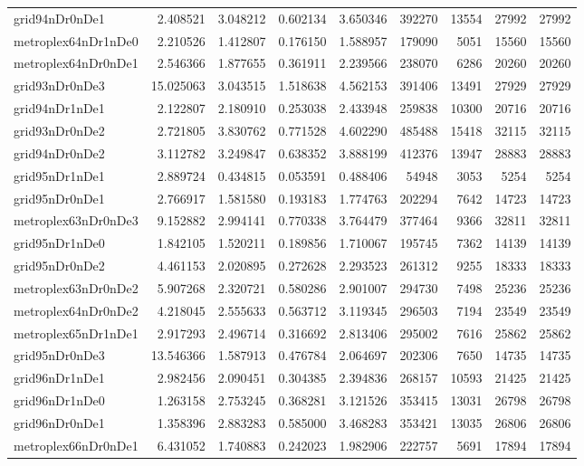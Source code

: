 \begin{longtable}{|l|r|r|r|r|r|r|r|r|}
grid94nDr0nDe1 & 2.408521 & 3.048212 & 0.602134 & 3.650346 & 392270 & 13554 & 27992 & 27992 \\
metroplex64nDr1nDe0 & 2.210526 & 1.412807 & 0.176150 & 1.588957 & 179090 & 5051 & 15560 & 15560 \\
metroplex64nDr0nDe1 & 2.546366 & 1.877655 & 0.361911 & 2.239566 & 238070 & 6286 & 20260 & 20260 \\
grid93nDr0nDe3 & 15.025063 & 3.043515 & 1.518638 & 4.562153 & 391406 & 13491 & 27929 & 27929 \\
grid94nDr1nDe1 & 2.122807 & 2.180910 & 0.253038 & 2.433948 & 259838 & 10300 & 20716 & 20716 \\
grid93nDr0nDe2 & 2.721805 & 3.830762 & 0.771528 & 4.602290 & 485488 & 15418 & 32115 & 32115 \\
grid94nDr0nDe2 & 3.112782 & 3.249847 & 0.638352 & 3.888199 & 412376 & 13947 & 28883 & 28883 \\
grid95nDr1nDe1 & 2.889724 & 0.434815 & 0.053591 & 0.488406 & 54948 & 3053 & 5254 & 5254 \\
grid95nDr0nDe1 & 2.766917 & 1.581580 & 0.193183 & 1.774763 & 202294 & 7642 & 14723 & 14723 \\
metroplex63nDr0nDe3 & 9.152882 & 2.994141 & 0.770338 & 3.764479 & 377464 & 9366 & 32811 & 32811 \\
grid95nDr1nDe0 & 1.842105 & 1.520211 & 0.189856 & 1.710067 & 195745 & 7362 & 14139 & 14139 \\
grid95nDr0nDe2 & 4.461153 & 2.020895 & 0.272628 & 2.293523 & 261312 & 9255 & 18333 & 18333 \\
metroplex63nDr0nDe2 & 5.907268 & 2.320721 & 0.580286 & 2.901007 & 294730 & 7498 & 25236 & 25236 \\
metroplex64nDr0nDe2 & 4.218045 & 2.555633 & 0.563712 & 3.119345 & 296503 & 7194 & 23549 & 23549 \\
metroplex65nDr1nDe1 & 2.917293 & 2.496714 & 0.316692 & 2.813406 & 295002 & 7616 & 25862 & 25862 \\
grid95nDr0nDe3 & 13.546366 & 1.587913 & 0.476784 & 2.064697 & 202306 & 7650 & 14735 & 14735 \\
grid96nDr1nDe1 & 2.982456 & 2.090451 & 0.304385 & 2.394836 & 268157 & 10593 & 21425 & 21425 \\
grid96nDr1nDe0 & 1.263158 & 2.753245 & 0.368281 & 3.121526 & 353415 & 13031 & 26798 & 26798 \\
grid96nDr0nDe1 & 1.358396 & 2.883283 & 0.585000 & 3.468283 & 353421 & 13035 & 26806 & 26806 \\
metroplex66nDr0nDe1 & 6.431052 & 1.740883 & 0.242023 & 1.982906 & 222757 & 5691 & 17894 & 17894 \\

\end{longtable}
